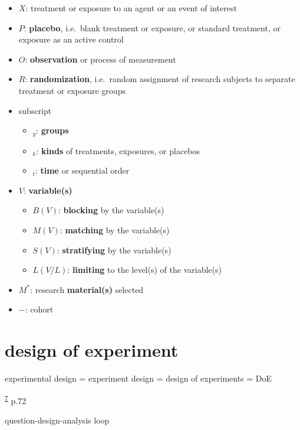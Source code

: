 \documentclass[
]{book}
\providecommand{\tightlist}{%
  \setlength{\itemsep}{0pt}\setlength{\parskip}{0pt}}
\theoremstyle{definition}
\theoremstyle{definition}
\theoremstyle{definition}
\theoremstyle{definition}
\theoremstyle{remark}
\begin{document}
\begin{itemize}
\tightlist
\item
  \(X\): treatment or exposure to an agent or an event of interest
\item
  \(P\): \textbf{placebo}, i.e.~blank treatment or exposure, or standard treatment, or exposure as an active control
\item
  \(O\): \textbf{observation} or process of measurement
\item
  \(R\): \textbf{randomization}, i.e.~random assignment of research subjects to separate treatment or exposure groups
\item
  subscript

  \begin{itemize}
  \tightlist
  \item
    \(_g\): \textbf{groups}
  \item
    \(_k\): \textbf{kinds} of treatments, exposures, or placebos
  \item
    \(_t\): \textbf{time} or sequential order
  \end{itemize}
\item
  \(V\): \textbf{variable(s)}

  \begin{itemize}
  \tightlist
  \item
    \(B(V)\): \textbf{blocking} by the variable(s)
  \item
    \(M(V)\): \textbf{matching} by the variable(s)
  \item
    \(S(V)\): \textbf{stratifying} by the variable(s)
  \item
    \(L(V/L)\): \textbf{limiting} to the level(s) of the variable(s)
  \end{itemize}
\item
  \(M^{*}\): research \textbf{material(s)} selected
\item
  \(-\): cohort
\end{itemize}

\hypertarget{design-of-experiment}{%
\chapter{design of experiment}\label{design-of-experiment}}

experimental design = experiment design = design of experiments = DoE

\textsuperscript{\protect\hyperlink{ref-hu2022}{7}} p.72

question-design-analysis loop
\end{document}
